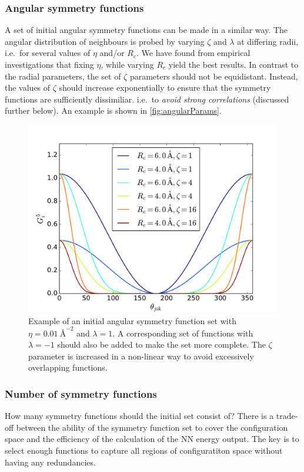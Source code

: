 \documentclass[twoside,english]{uiofysmaster}
\begin{document}
\subsubsection{Angular symmetry functions}
A set of initial angular symmetry functions can be made in a similar way. 
The angular distribution of neighbours is probed by varying $\zeta$ and $\lambda$ at differing radii, i.e.\ for 
several values of $\eta$ and/or $R_c$. 
We have found from empirical investigations that fixing $\eta$, while varying $R_c$ yield the best results. 
In contrast to the radial parameters, the set of $\zeta$ parameters should not be equidistant. Instead, the values of $\zeta$
should increase exponentially to ensure that the symmetry functions are sufficiently dissimiliar. i.e.\ to \textit{avoid
strong correlations} (discussed further below).  An example is shown in \autoref{fig:angularParams}. 
\begin{figure}
\centering
  \includegraphics[width = 0.7\linewidth]{Figures/Implementation/angularParams1.pdf}
  \caption{Example of an initial angular symmetry function set
  with $\eta = \SI{0.01}{\angstrom}^{-2}$ and 
  $\lambda = 1$. A corresponding set of functions with $\lambda = -1$ should also be added to make the set more complete. 
  The $\zeta$ parameter is increased in a non-linear way to avoid excessively overlapping functions. }
  \label{fig:angularParams}
\end{figure}

\subsubsection{Number of symmetry functions}
How many symmetry functions should the initial set consist of?
There is a trade-off between the ability of the symmetry function set to cover the configuration space and 
the efficiency of the calculation of the NN energy output. The key is to select enough functions to capture 
all regions of configuratiton space without having any redundancies. 
\end{document}
